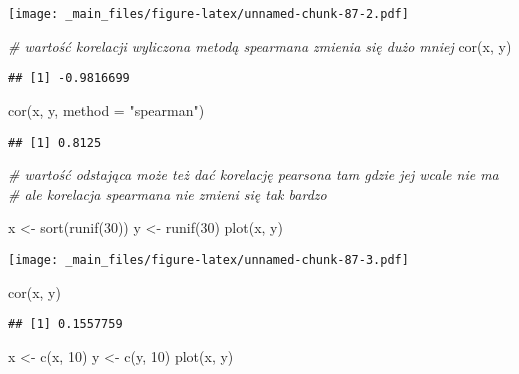 \documentclass[
]{book}
\newenvironment{Shaded}{\begin{snugshade}}{\end{snugshade}}
\newcommand{\AttributeTok}[1]{\textcolor[rgb]{0.77,0.63,0.00}{#1}}
\newcommand{\CommentTok}[1]{\textcolor[rgb]{0.56,0.35,0.01}{\textit{#1}}}
\newcommand{\DecValTok}[1]{\textcolor[rgb]{0.00,0.00,0.81}{#1}}
\newcommand{\FunctionTok}[1]{\textcolor[rgb]{0.00,0.00,0.00}{#1}}
\newcommand{\NormalTok}[1]{#1}
\newcommand{\OtherTok}[1]{\textcolor[rgb]{0.56,0.35,0.01}{#1}}
\newcommand{\StringTok}[1]{\textcolor[rgb]{0.31,0.60,0.02}{#1}}
\begin{document}
\texttt{[image: \_main\_files/figure-latex/unnamed-chunk-87-2.pdf]}

\begin{Shaded}
\begin{Highlighting}[]
\CommentTok{\# wartość korelacji wyliczona metodą spearmana zmienia się dużo mniej}
\FunctionTok{cor}\NormalTok{(x, y)}
\end{Highlighting}
\end{Shaded}

\begin{verbatim}
## [1] -0.9816699
\end{verbatim}

\begin{Shaded}
\begin{Highlighting}[]
\FunctionTok{cor}\NormalTok{(x, y, }\AttributeTok{method =} \StringTok{"spearman"}\NormalTok{)}
\end{Highlighting}
\end{Shaded}

\begin{verbatim}
## [1] 0.8125
\end{verbatim}

\begin{Shaded}
\begin{Highlighting}[]
\CommentTok{\# wartość odstająca może też dać korelację pearsona tam gdzie jej wcale nie ma}
\CommentTok{\# ale korelacja spearmana nie zmieni się tak bardzo}

\NormalTok{x }\OtherTok{\textless{}{-}} \FunctionTok{sort}\NormalTok{(}\FunctionTok{runif}\NormalTok{(}\DecValTok{30}\NormalTok{))}
\NormalTok{y }\OtherTok{\textless{}{-}} \FunctionTok{runif}\NormalTok{(}\DecValTok{30}\NormalTok{)}
\FunctionTok{plot}\NormalTok{(x, y)}
\end{Highlighting}
\end{Shaded}

\texttt{[image: \_main\_files/figure-latex/unnamed-chunk-87-3.pdf]}

\begin{Shaded}
\begin{Highlighting}[]
\FunctionTok{cor}\NormalTok{(x, y)}
\end{Highlighting}
\end{Shaded}

\begin{verbatim}
## [1] 0.1557759
\end{verbatim}

\begin{Shaded}
\begin{Highlighting}[]
\NormalTok{x }\OtherTok{\textless{}{-}} \FunctionTok{c}\NormalTok{(x, }\DecValTok{10}\NormalTok{)}
\NormalTok{y }\OtherTok{\textless{}{-}} \FunctionTok{c}\NormalTok{(y, }\DecValTok{10}\NormalTok{)}
\FunctionTok{plot}\NormalTok{(x, y)}
\end{Highlighting}
\end{Shaded}
\end{document}
